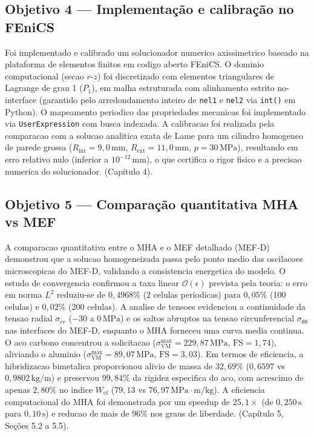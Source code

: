 \subsection{Objetivo 4 — Implementação e calibração no FEniCS}
Foi implementado e calibrado um solucionador numerico axissimetrico baseado na plataforma de elementos finitos em codigo aberto FEniCS. O dominio computacional (secao $r$-$z$) foi discretizado com elementos triangulares de Lagrange de grau 1 ($P_1$), em malha estruturada com alinhamento estrito no-interface (garantido pelo arredondamento inteiro de \texttt{nel1} e \texttt{nel2} via \texttt{int()} em Python). O mapeamento periodico das propriedades mecanicas foi implementado via \texttt{UserExpression} com busca indexada. A calibracao foi realizada pela comparacao com a solucao analitica exata de Lame para um cilindro homogeneo de parede grossa ($R_{\text{int}} = 9{,}0\,\text{mm}$, $R_{\text{ext}} = 11{,}0\,\text{mm}$, $p = 30\,\text{MPa}$), resultando em erro relativo nulo (inferior a $10^{-12}\,\text{mm}$), o que certifica o rigor fisico e a precisao numerica do solucionador. (Capítulo 4).

\subsection{Objetivo 5 — Comparação quantitativa MHA vs MEF}
A comparacao quantitativa entre o MHA e o MEF detalhado (MEF-D) demonstrou que a solucao homogeneizada passa pelo ponto medio das oscilacoes microscopicas do MEF-D, validando a consistencia energetica do modelo. O estudo de convergencia confirmou a taxa linear $\mathcal{O}(\epsilon)$ prevista pela teoria: o erro em norma $L^2$ reduziu-se de $0,4968\%$ (2 celulas periodicas) para $0{,}05\%$ (100 celulas) e $0{,}02\%$ (200 celulas). A analise de tensoes evidenciou a continuidade da tensao radial $\sigma_{rr}$ ($-30$ a $0\,\text{MPa}$) e os saltos abruptos na tensao circunferencial $\sigma_{\theta\theta}$ nas interfaces do MEF-D, enquanto o MHA forneceu uma curva media continua. O aco carbono concentrou a solicitacao ($\sigma_{\text{VM}}^{\max} = 229{,}87\,\text{MPa}$, $\text{FS} = 1{,}74$), aliviando o aluminio ($\sigma_{\text{VM}}^{\max} = 89{,}07\,\text{MPa}$, $\text{FS} = 3{,}03$). Em termos de eficiencia, a hibridizacao bimetalica proporcionou alivio de massa de $32{,}69\%$ ($0{,}6597$ vs $0{,}9802\,\text{kg/m}$) e preservou $99{,}84\%$ da rigidez especifica do aco, com acrescimo de apenas $2{,}80\%$ no indice $W_{\text{ef}}$ ($79{,}13$ vs $76{,}97\,\text{MPa}\cdot\text{m/kg}$). A eficiencia computacional do MHA foi demonstrada por um speedup de $25{,}1\times$ (de $0{,}250\,\text{s}$ para $0{,}10\,\text{s}$) e reducao de mais de $96\%$ nos graus de liberdade. (Capítulo 5, Seções 5.2 a 5.5).

